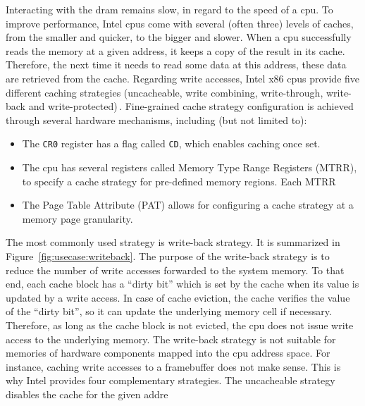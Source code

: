 Interacting with the \ac{dram} remains slow, in regard to the speed of a
\ac{cpu}.
%
To improve performance, Intel \acp{cpu} come with several (often three)
levels of caches, from the smaller and quicker, to the bigger and
slower. 
%
When a \ac{cpu} successfully reads the memory at a given address, it keeps a
copy of the result in its cache.
%
Therefore, the next time it needs to read some data at this address, these data
are retrieved from the cache.
%
Regarding write accesses, Intel x86 \acp{cpu} provide five different caching
strategies (uncacheable, write combining, write-through, write-back and
write-protected)\,\cite{intel2014manualcache}.
%
Fine-grained cache strategy configuration is achieved through several hardware
mechanisms, including (but not limited to):
%
\begin{itemize}
\item The \texttt{CR0} register has a flag called \texttt{CD}, which enables
  caching once set.
%
\item The \ac{cpu} has several registers called Memory Type Range Registers
  (MTRR), to specify a cache strategy for pre-defined memory regions.
  Each MTRR
\item The Page Table Attribute (PAT) allows for configuring a cache strategy at
  a memory page granularity.
\end{itemize}
%
The most commonly used strategy is write-back strategy.
%
It is summarized in Figure~\ref{fig:usecase:writeback}.
%
The purpose of the write-back strategy is to reduce the number of write accesses
forwarded to the system memory.
%
To that end, each cache block has a ``dirty bit'' which is set by the cache when
its value is updated by a write access.
%
In case of cache eviction, the cache verifies the value of the ``dirty bit'', so
it can update the underlying memory cell if necessary.
%
Therefore, as long as the cache block is not evicted, the \ac{cpu} does not
issue write access to the underlying memory.
%
The write-back strategy is not suitable for memories of hardware components
mapped into the \ac{cpu} address space.
%
For instance, caching write accesses to a framebuffer does not make sense.
%
This is why Intel provides four complementary strategies.
%
The uncacheable strategy disables the cache for the given addre

